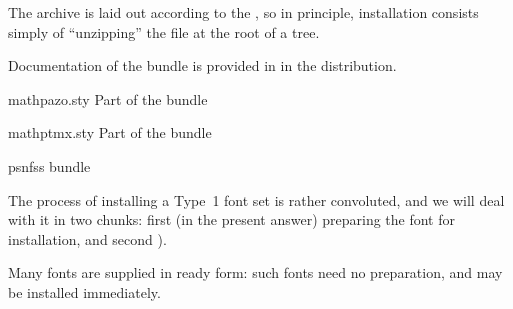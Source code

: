 The archive  is laid out according to the
, so in principle, installation consists simply of
``unzipping'' the file at the root of a  tree.

Documentation of the  bundle is provided in
 in the distribution.
\begin{ctanrefs}
\item[mathpazo.sty]Part of the  bundle
\item[mathptmx.sty]Part of the  bundle
\item[psnfss \nothtml{\rmfamily}bundle]
\end{ctanrefs}


The process of installing a Type~1 font set is rather convoluted, and
we will deal with it in two chunks: first (in the present answer)
preparing the font for installation, and second %
).

Many fonts are supplied in \AllTeX{} ready form: such fonts need no
preparation, and may be installed immediately.


